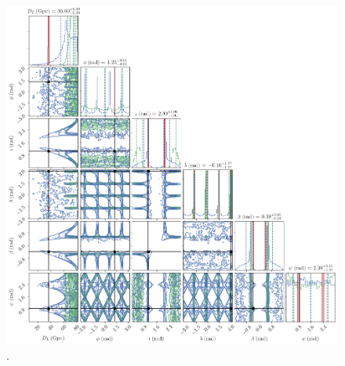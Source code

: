 \documentclass[aps,showpacs,twocolumn,prd,superscriptaddress,nofootinbib]{revtex4-1}
\begin{document}
\begin{figure}
  \centering
  \includegraphics[width=.8\linewidth]{../plots/corner_smbh_case9_simplelike_ptmcmc_bambi.png}
  \caption{.}
  \label{fig:PEsmbh22hmSimpleLikeCase9}
\end{figure}
\end{document}
